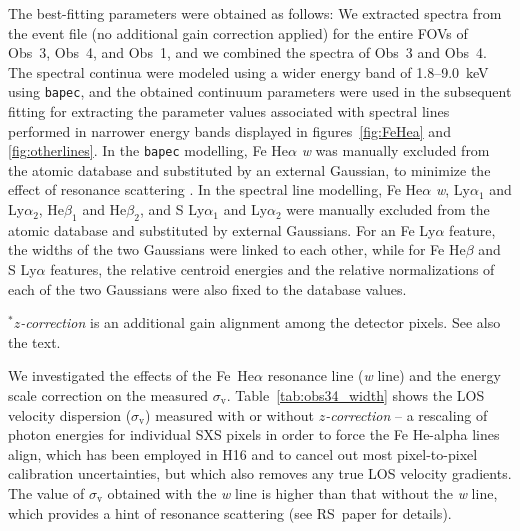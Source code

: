 The best-fitting parameters were obtained as follows: We extracted
spectra from the event file (no additional gain correction applied) for
the entire FOVs of Obs~3, Obs~4, and Obs~1, and we combined the spectra
of Obs~3 and Obs~4. The spectral continua were modeled using a wider
energy band of 1.8--9.0~keV using
\verb+bapec+, and the obtained continuum parameters were used in the subsequent fitting for extracting the parameter values associated with spectral lines performed in narrower energy bands displayed in figures~\ref{fig:FeHea} and \ref{fig:otherlines}. In the \verb+bapec+
modelling, Fe He$\alpha$ {\it w} was manually excluded from the
atomic database and substituted by an external Gaussian, to
minimize the effect of resonance scattering \cite[most pronounced for
Fe He$\alpha$ {\it w}, see][hereafter RS~paper]{rspaper}. In the
spectral line modelling, Fe He$\alpha$ {\it w}, Ly$\alpha_1$ and
Ly$\alpha_2$, He$\beta_1$ and He$\beta_2$, and S Ly$\alpha_1$ and
Ly$\alpha_2$ were manually excluded from the atomic database and
substituted by external Gaussians. For an Fe Ly$\alpha$ feature, the
widths of the two Gaussians were linked to each other, while for Fe
He$\beta$ and S Ly$\alpha$ features, the relative centroid energies and
the relative normalizations of each of the two Gaussians were also fixed
to the database values.

\begin{table*}
 \label{tab:obs34_width}
 \begin{tabnote}
 $^*${\it $z$-correction} is an additional gain alignment among the detector pixels. See also the text.
 \end{tabnote}
\end{table*}

We investigated the effects of the Fe~He$\alpha$ resonance line ({\it w} line) and the energy scale correction on the measured $\sigma_\mathrm{v}$. Table~\ref{tab:obs34_width} shows the LOS velocity dispersion ($\sigma_\mathrm{v}$) measured with or without {\it $z$-correction} -- a rescaling of photon energies for individual SXS pixels in order to force the Fe He-alpha lines align, which has been employed in H16 and \citet{hitomi17} to cancel out most pixel-to-pixel calibration uncertainties, but which also removes any true LOS velocity gradients. The value of $\sigma_\mathrm{v}$ obtained with the {\it w} line is higher than that without the {\it w} line, which provides a hint of resonance scattering (see RS~paper for details).
